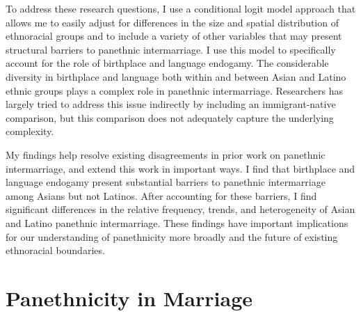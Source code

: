 \documentclass[11pt,]{article}
\begin{document}
To address these research questions, I use a conditional logit model approach \citep{gullickson_counterfactual_2021} that allows me to easily adjust for differences in the size and spatial distribution of ethnoracial groups and to include a variety of other variables that may present structural barriers to panethnic intermarriage. I use this model to specifically account for the role of birthplace and language endogamy. The considerable diversity in birthplace and language both within and between Asian and Latino ethnic groups plays a complex role in panethnic intermarriage. Researchers has largely tried to address this issue indirectly by including an immigrant-native comparison, but this comparison does not adequately capture the underlying complexity.

My findings help resolve existing disagreements in prior work on panethnic intermarriage, and extend this work in important ways. I find that birthplace and language endogamy present substantial barriers to panethnic intermarriage among Asians but not Latinos. After accounting for these barriers, I find significant differences in the relative frequency, trends, and heterogeneity of Asian and Latino panethnic intermarriage. These findings have important implications for our understanding of panethnicity more broadly and the future of existing ethnoracial boundaries.

\hypertarget{panethnicity-in-marriage}{%
\section{Panethnicity in Marriage}\label{panethnicity-in-marriage}}
\end{document}
